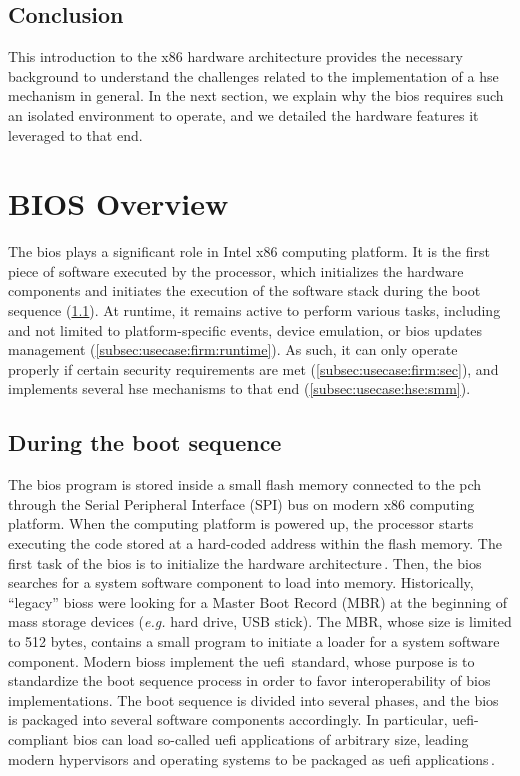\subsection*{Conclusion}

This introduction to the x86 hardware architecture provides the necessary
background to understand the challenges related to the implementation of a
\ac{hse} mechanism in general.
%
In the next section, we explain why the \ac{bios} requires such an isolated
environment to operate, and we detailed the hardware features it leveraged to
that end.

\section{BIOS Overview}
\label{sec:usecase:firmware}

The \ac{bios} plays a significant role in Intel x86 computing platform.
%
It is the first piece of software executed by the processor, which initializes
the hardware components and initiates the execution of the software stack during
the boot sequence (\ref{subsec:usecase:firm:boot}).
%
At runtime, it remains active to perform various tasks, including and not
limited to platform-specific events, device emulation, or \ac{bios} updates
management (\ref{subsec:usecase:firm:runtime}).
%
As such, it can only operate properly if certain security requirements are met
(\ref{subsec:usecase:firm:sec}), and implements several \ac{hse} mechanisms to
that end (\ref{subsec:usecase:hse:smm}).

\subsection{During the boot sequence}
\label{subsec:usecase:firm:boot}

The \ac{bios} program is stored inside a small flash memory connected to the
\ac{pch} through the Serial Peripheral Interface (SPI) bus on modern x86
computing platform.
%
When the computing platform is powered up, the processor starts executing the
code stored at a hard-coded address within the flash memory.
%
The first task of the \ac{bios} is to initialize the hardware
architecture\,\cite{salihun2006bios}.
%
Then, the \ac{bios} searches for a system software component to load into
memory.
%
Historically, ``legacy'' \acp{bios} were looking for a Master Boot Record (MBR)
at the beginning of mass storage devices (\emph{e.g.} hard drive, USB stick).
%
The MBR, whose size is limited to 512 bytes, contains a small program to
initiate a loader for a system software component.
%
Modern \acp{bios} implement the \ac{uefi}\,\cite{zimmer2007uefi,uefi2017specs}
standard, whose purpose is to standardize the boot sequence process in order to
favor interoperability of \ac{bios} implementations.
%
The boot sequence is divided into several phases, and the \ac{bios} is packaged
into several software components accordingly.
%
In particular, \ac{uefi}-compliant \ac{bios} can load so-called \ac{uefi}
applications of arbitrary size, leading modern hypervisors and operating systems
to be packaged as \ac{uefi} applications\,\cite{2011efistub}.

